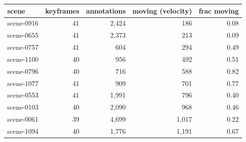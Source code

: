\footnotesize\renewcommand{\arraystretch}{0.92}
\begin{tabular}{lrrrr}
\toprule
scene & keyframes & annotations & moving (velocity) & frac moving \\
\midrule
scene-0916 & 41 & 2,424 & 186 & 0.08 \\
scene-0655 & 41 & 2,373 & 213 & 0.09 \\
scene-0757 & 41 & 604 & 294 & 0.49 \\
scene-1100 & 40 & 956 & 492 & 0.51 \\
scene-0796 & 40 & 716 & 588 & 0.82 \\
scene-1077 & 41 & 909 & 701 & 0.77 \\
scene-0553 & 41 & 1,991 & 796 & 0.40 \\
scene-0103 & 40 & 2,090 & 968 & 0.46 \\
scene-0061 & 39 & 4,699 & 1,017 & 0.22 \\
scene-1094 & 40 & 1,776 & 1,191 & 0.67 \\
\bottomrule
\end{tabular}
